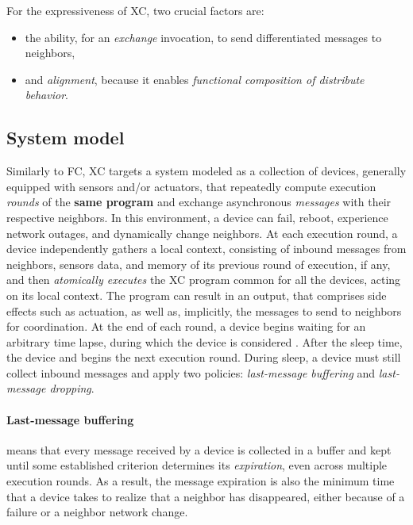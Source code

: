 For the expressiveness of \ac{XC}, two crucial factors are:
\begin{itemize}
    \item the ability, for an \textit{exchange} invocation, to send differentiated messages to neighbors,
    \item and \textit{alignment}, because it enables \textit{functional composition of distribute behavior}\cite{xc}.
\end{itemize}

\subsection{System model}

Similarly to \ac{FC}, \ac{XC} targets a system modeled as a collection of devices, generally equipped with sensors and/or actuators, that repeatedly compute execution \textit{rounds} of the \textbf{same program} and exchange asynchronous \textit{messages} with their respective neighbors\cite{xc}.
%
In this environment, a device can fail, reboot, experience network outages, and dynamically change neighbors.
%
At each execution round, a device independently gathers a local context, consisting of inbound messages from neighbors, sensors data, and memory of its previous round of execution, if any, and then \textit{atomically executes} the \ac{XC} program common for all the devices, acting on its local context\cite{xc}.
%
The program can result in an output, that comprises side effects such as actuation, as well as, implicitly, the messages to send to neighbors for coordination\cite{xc}.
%
At the end of each round, a device begins waiting for an arbitrary time lapse, during which the device is considered .
%
After the sleep time, the device  and begins the next execution round\cite{xc}.
%
During sleep, a device must still collect inbound messages and apply two policies: \textit{last-message buffering} and \textit{last-message dropping}.

\paragraph{Last-message buffering} means that every message received by a device is collected in a buffer and kept until some established criterion determines its \textit{expiration}, even across multiple execution rounds\cite{xc}.
%
As a result, the message expiration is also the minimum time that a device takes to realize that a neighbor has disappeared, either because of a failure or a neighbor network change.

